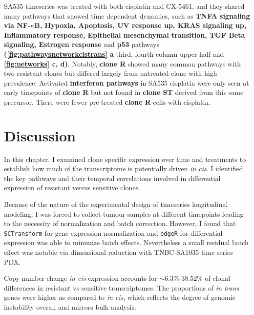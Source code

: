 
SA535 timeseries was treated with both cisplatin and CX-5461, and they shared many pathways that showed time dependent dynamics, such as \textbf{TNFA signaling via NF-$\kappa$B, Hypoxia, Apoptosis, UV response up, KRAS signaling up, Inflammatory response, Epithelial mesenchymal transition, TGF Beta signaling, Estrogen response} and \textbf{p53} pathways \textbf{(\autoref{fig:pathwaysnetworkcistrans} a} third, fourth column upper half and \textbf{\autoref{fig:networks} c, d)}. 
Notably, \textbf{clone R} showed many common pathways with two resistant clones but differed largely from untreated clone with high prevalence. Activated \textbf{interferon pathways} in SA535 cisplatin were only seen at early timepoints of \textbf{clone R} but not found in \textbf{clone ST} derived from this same precursor. There were fewer pre-treated   \textbf{clone R} cells with cisplatin.  


\section{Discussion}
In this chapter, I examined clone specific expression over time and treatments to establish how much of the transcriptome is potentially driven \textit{in cis}. I identified the key pathways and their temporal correlations involved in differential expression of resistant versus sensitive clones.

Because of the nature of the experimental design of timeseries longitudinal modeling, I was forced to collect tumour samples at different timepoints leading to the necessity of normalization and batch correction. 
However, I found that \texttt{SCTransform} for gene expression normalization and \texttt{edgeR} for differential expression was able to minimize batch effects. Nevertheless a small residual batch effect was notable via dimensional reduction with TNBC-SA1035 time series PDX. 
 

Copy number change \textit{in cis} expression accounts for $\sim${6.3\%-38.52\%} of clonal differences in resistant vs sensitive transcriptomes. The proportions of \textit{in trans} genes were higher as compared to \textit{in cis}, which reflects the degree of genomic instability overall and mirrors bulk analysis.
 
